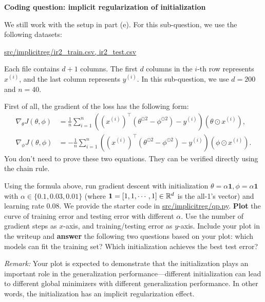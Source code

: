 \item{}\textbf{} \textbf{Coding question: implicit regularization of initialization}

We still work with the setup in part (e).
For this sub-question, we use the following datasets:
\begin{center}
	\url{src/implicitreg/ir2_train.csv, ir2_test.csv}
\end{center}
Each file contains $d+1$ columns. The first $d$ columns in the $i$-th row represents $x^{(i)}$, and the last column represents $y^{(i)}.$ In this sub-question, we use $d=200$ and $n=40$.

First of all, the gradient of the loss has the following form:
\begin{align}
	\nabla_\theta J(\theta,\phi)&=\frac{1}{n}\sum_{i=1}^{n}((x^{(i)})^\top (\theta^{\odot 2} -\phi^{\odot 2})-y^{(i)})(\theta\odot x^{(i)}),\\
	\nabla_\phi J(\theta,\phi)&=-\frac{1}{n}\sum_{i=1}^{n}((x^{(i)})^\top (\theta^{\odot 2} -\phi^{\odot 2})-y^{(i)})(\phi\odot x^{(i)}).
\end{align}
You don't need to prove these two equations. They can be verified directly using the chain rule.

Using the formula above, run gradient descent with initialization $\theta=\alpha \mathbf{1}, \phi=\alpha\mathbf{1}$ with $\alpha\in \{0.1, 0.03, 0.01\}$ (where $\mathbf{1}=[1,1,\cdots,1]\in\mathbb{R}^{d}$ is the all-1's vector) and learning rate $0.08$. We provide the starter code in \url{src/implicitreg/qp.py}. \textbf{Plot} the curve of training error and testing error with different $\alpha$. Use the number of gradient steps as $x$-axis, and training/testing error as $y$-axis. Include your plot in the writeup and \textbf{answer} the following two questions based on your plot: which models can fit the training set? Which initialization achieves the best test error? 

\textit{Remark:} Your plot is expected to demonstrate that the initialization plays an important role in the generalization performance---different initialization can lead to different global minimizers with different generalization performance. In other words, the initialization has an implicit regularization effect. 